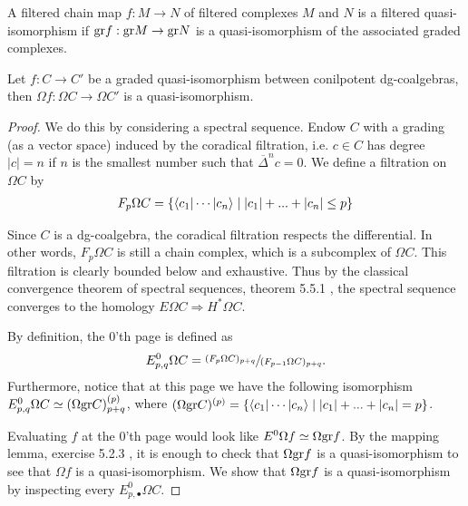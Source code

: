 \documentclass[../thesis.tex]{subfiles}
\begin{document}
            \begin{definition}
                A filtered chain map $f : M \rightarrow N$ of filtered complexes $M$ and $N$ is a filtered quasi-isomorphism if $\tt{gr}f : \tt{gr}M \rightarrow \tt{gr}N$ is a quasi-isomorphism of the associated graded complexes.
            \end{definition}

            \begin{lemma}\label{lem: graded-qif-are-w}
                Let $f : C\rightarrow C'$ be a graded quasi-isomorphism between conilpotent dg-coalgebras, then $\Omega f : \Omega C \rightarrow \Omega C'$ is a quasi-isomorphism. 
            \end{lemma}

            \begin{proof}
                We do this by considering a spectral sequence. Endow $C$ with a grading (as a vector space) induced by the coradical filtration, i.e. $c\in C$ has degree $|c|=n$ if $n$ is the smallest number such that $\overline{\Delta}^nc = 0$. We define a filtration on $\Omega C$ by
                \begin{align*}
                    F_p\Omega C = \startset{\langle c_1 | \cdots | c_n \rangle \mid |c_1|+...+|c_n|\leq p}
                \end{align*}

                Since $C$ is a dg-coalgebra, the coradical filtration respects the differential. In other words, $F_p\Omega C$ is still a chain complex, which is a subcomplex of $\Omega C$. This filtration is clearly bounded below and exhaustive. Thus by the classical convergence theorem of spectral sequences, theorem 5.5.1 \cite{Weibel94}, the spectral sequence converges to the homology $E\Omega C \Rightarrow H^*\Omega C$.

                By definition, the $0$'th page is defined as 
                \begin{align*}
                    E^0_{p,q}\Omega C = \sfrac{(F_p\Omega C)_{p+q}}{(F_{p-1}\Omega C)_{p+q}}\tt{.}
                \end{align*}
                Furthermore, notice that at this page we have the following isomorphism $E^0_{p,q}\Omega C \simeq (\Omega \tt{gr}C)^{(p)}_{p+q}$, where $(\Omega \tt{gr}C)^{(p)} = \startset{\langle c_1 | \cdots | c_n \rangle \mid |c_1|+...+|c_n| = p}$.

                Evaluating $f$ at the $0$'th page would look like $E^0\Omega f \simeq \Omega \tt{gr}f$. By the mapping lemma, exercise 5.2.3 \cite{Weibel94}, it is enough to check that $\Omega \tt{gr}f$ is a quasi-isomorphism to see that $\Omega f$ is a quasi-isomorphism. We show that $\Omega \tt{gr}f$ is a quasi-isomorphism by inspecting every $E^0_{p,\bullet}\Omega C$.


\end{proof}
\end{document}
